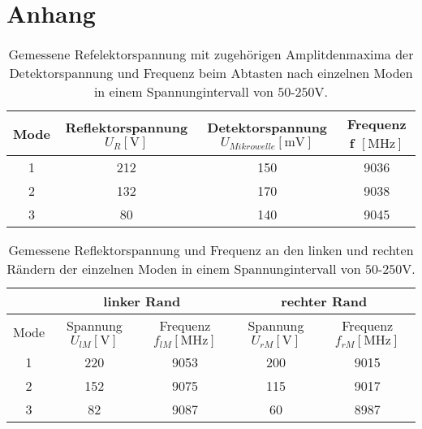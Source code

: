 \newpage
\section{Anhang}

\begin{table}
    \centering
    \caption{Gemessene Refelektorspannung mit zugehörigen Amplitdenmaxima der Detektorspannung und Frequenz beim Abtasten nach einzelnen Moden in einem Spannungintervall von $50$-$250 \si{\volt}$.} 
    \label{tab:Messreihe11}
    \begin{tabular}{c | c c c}
        \toprule
        Mode & Reflektorspannung $U_{R} [\si{\volt}] $ & Detektorspannung $ U_{Mikrowelle} [\si{\milli\volt}] $ & Frequenz f $[\si{\mega\hertz}]$ \\
        \midrule
        1      &      212         &       150              &        9036 \\
        2      &      132         &       170              &        9038 \\
        3      &      80          &       140              &        9045 \\
    \end{tabular}
\end{table}
 
\begin{table}
    \centering
    \caption{Gemessene Reflektorspannung und Frequenz an den linken und rechten Rändern der einzelnen Moden in einem Spannungintervall von $50$-$250 \si{\volt}$.}
    \label{tab:Messreihe12}
    \begin{tabular}{c | c c | c c}
        \midrule
        ~ &  \multicolumn{2}{c}{linker Rand} & \multicolumn{2}{c}{rechter Rand} \\
        \toprule
        Mode & Spannung $U_{lM} [\si{\volt}] $ & Frequenz $f_{lM}[\si{\mega\hertz}]$ & Spannung $U_{rM} [\si{\volt}] $ & Frequenz $f_{rM}[\si{\mega\hertz}]$ \\
        \midrule
        1     &     220         &            9053            &                200          &              9015      \\
        2      &    152         &            9075            &                115          &              9017      \\
        3       &   82          &            9087            &                60           &              8987      \\
    \end{tabular}
\end{table}

